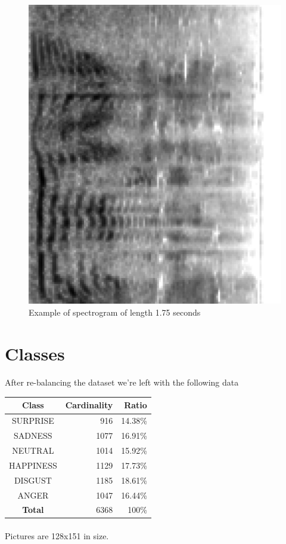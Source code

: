 \begin{figure}[H]
	\centering
	\includegraphics[width=0.7\linewidth, angle=90, interpolate=false]{assets/ex1.big.png}
	\caption{Example of spectrogram of length 1.75 seconds}
	\label{fig:ex2}
\end{figure}

\section{Classes}

\paragraph{}
After re-balancing the dataset we're left with the following data


\vspace{10mm}
\begin{tabular}{|c|r|r|}
	\hline
	Class & Cardinality & Ratio \\
	\hline\hline
	SURPRISE	& 916 & 14.38\% \\
	\hline
	SADNESS		& 1077 & 16.91\% \\
	\hline
	NEUTRAL		& 1014 & 15.92\%\\
	\hline
	HAPPINESS	& 1129 & 17.73\%\\
	\hline
	DISGUST		& 1185 & 18.61\%\\
	\hline
	ANGER		& 1047 & 16.44\%\\
	\hline\hline
	\textbf{Total} & 6368 & 100\% \\
	\hline
\end{tabular}

\paragraph{}
Pictures are 128x151 in size.

